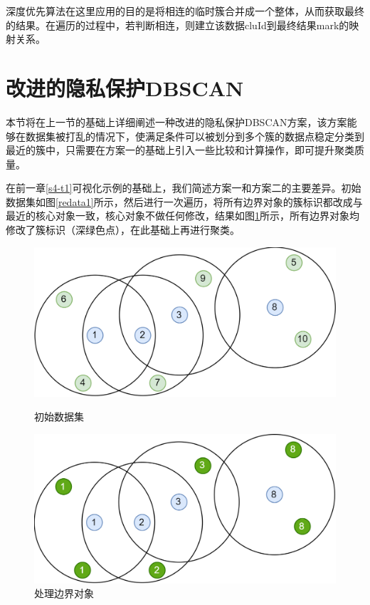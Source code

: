 深度优先算法在这里应用的目的是将相连的临时簇合并成一个整体，从而获取最终的结果。在遍历的过程中，若判断相连，则建立该数据cluId到最终结果mark的映射关系。

\section{改进的隐私保护DBSCAN}
\label{s4-t2}
本节将在上一节的基础上详细阐述一种改进的隐私保护DBSCAN方案，该方案能够在数据集被打乱的情况下，使满足条件可以被划分到多个簇的数据点稳定分类到最近的簇中，只需要在方案一的基础上引入一些比较和计算操作，即可提升聚类质量。

在前一章\ref{s4-t1}可视化示例的基础上，我们简述方案一和方案二的主要差异。初始数据集如图\ref{redata1}所示，然后进行一次遍历，将所有边界对象的簇标识都改成与最近的核心对象一致，核心对象不做任何修改，结果如图\ref{redata2}所示，所有边界对象均修改了簇标识（深绿色点），在此基础上再进行聚类。

\begin{figure}[!h]
	\begin{minipage}[t]{0.48\linewidth}
		\centering
		\includegraphics[width=\linewidth]{img/db1.png}
		\caption{初始数据集}
		\label{redata1}
	\end{minipage}
	\hfill
	\begin{minipage}[t]{0.48\linewidth}
		\centering
		\includegraphics[width=\linewidth]{img/redbscan.png}
		\caption{处理边界对象}
		\label{redata2}
	\end{minipage}
\end{figure}

